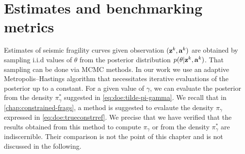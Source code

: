



\section{Estimates and benchmarking metrics}\label{sec:doe:metrics}




Estimates of seismic fragility curves given observation $(\mathbf{z}^k,\mathbf{a}^k)$ are obtained by sampling i.i.d values of $\theta$ from the posterior distribution $p(\theta|\mathbf{z}^k,\mathbf{a}^k)$. That sampling can be done via MCMC methods. In our work we use an adaptive Metropolis–Hastings algorithm \citep{haario_adaptive_2001} that necessitates iterative evaluations of the posterior up to a constant.
For a given value of $\gamma$, we can evaluate the posterior from the density $\pi^\ast_\gamma$ suggested in \cref{eq:doe:tilde-pi-gamma}. 
We recall that in \cref{chap:constrained-frags}, a method is suggested to evalaute the density $\pi_\gamma$ expressed in \cref{eq:doe:trueconstrref}.
We precise that we have verified that the results obtained from this method to compute $\pi_\gamma$ or from 
the density $\pi^\ast_\gamma$ are indiscernible. Their comparison is not the point of this chapter and is not discussed in the following.


